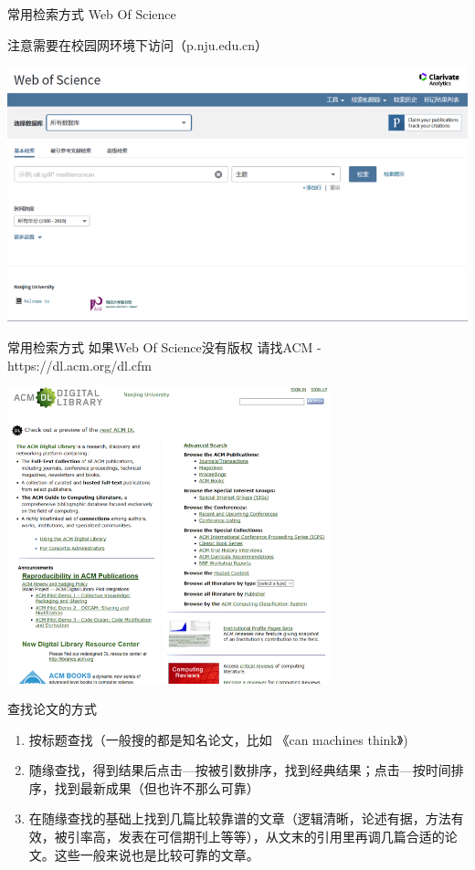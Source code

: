 \documentclass[10pt]{beamer}
\begin{document}
\begin{frame}[fragile]{常用检索方式}
    Web Of Science

    注意需要在校园网环境下访问（p.nju.edu.cn）

    \includegraphics[width=\textwidth]{pic/WebOfScience.png}
\end{frame}

\begin{frame}[fragile]{常用检索方式}
    如果Web Of Science没有版权 请找ACM - https://dl.acm.org/dl.cfm

    \includegraphics[width=0.7\textwidth]{pic/ACM.png}
\end{frame}

\begin{frame}[fragile]{查找论文的方式}
    \begin{enumerate}
        \item 按标题查找（一般搜的都是知名论文，比如 《can machines think》)
        \item 随缘查找，得到结果后点击—按被引数排序，找到经典结果；点击—按时间排序，找到最新成果（但也许不那么可靠）
        \item 在随缘查找的基础上找到几篇比较靠谱的文章（逻辑清晰，论述有据，方法有效，被引率高，发表在可信期刊上等等），从文末的引用里再调几篇合适的论文。这些一般来说也是比较可靠的文章。
    \end{enumerate}
\end{frame}
\end{document}
